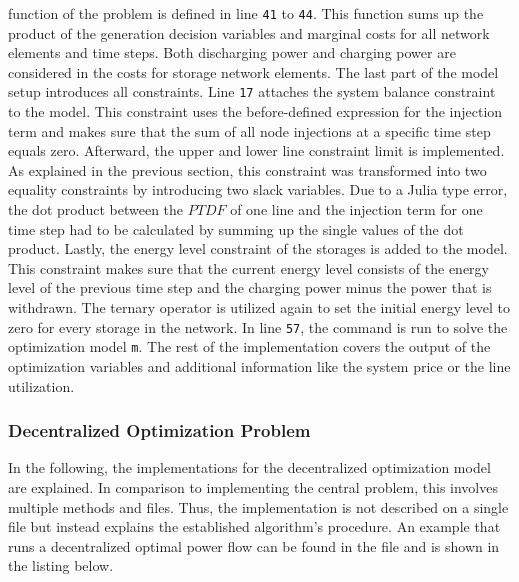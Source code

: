function of the problem is defined in line \texttt{41} to \texttt{44}. This function sums up the product of the generation decision variables and marginal costs for all network elements and time steps. Both discharging power and charging power are considered in the costs for storage network elements. The last part of the model setup introduces all constraints. Line \texttt{17} attaches the system balance constraint to the model. This constraint uses the before-defined expression for the injection term and makes sure that the sum of all node injections at a specific time step equals zero. Afterward, the upper and lower line constraint limit is implemented. As explained in the previous section, this constraint was transformed into two equality constraints by introducing two slack variables. Due to a Julia type error, the dot product between the $PTDF$ of one line and the injection term for one time step had to be calculated by summing up the single values of the dot product. Lastly, the energy level constraint of the storages is added to the model. This constraint makes sure that the current energy level consists of the energy level of the previous time step and the charging power minus the power that is withdrawn. The ternary operator is utilized again to set the initial energy level to zero for every storage in the network. In line \texttt{57}, the command is run to solve the optimization model \lstinline[language=julia]{m}. The rest of the implementation covers the output of the optimization variables and additional information like the system price or the line utilization.


\subsubsection{Decentralized Optimization Problem}

In the following, the implementations for the decentralized optimization model are explained. In comparison to implementing the central problem, this involves multiple methods and files. Thus, the implementation is not described on a single file but instead explains the established algorithm's procedure. An example that runs a decentralized optimal power flow can be found in the file  and is shown in the listing below.



